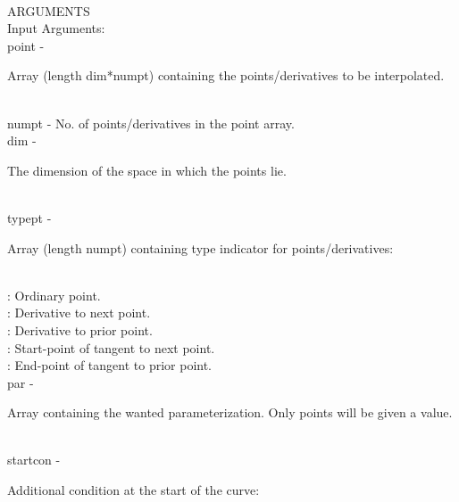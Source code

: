 \\
ARGUMENTS\\
        \>Input Arguments:\\
        \>\>    {\fov point}    \> - \> \begin{minipg2}
                                Array (length dim*numpt) containing the
                                points/derivatives to be interpolated.
                                \end{minipg2}\\[0.3ex]
        \>\>    {\fov numpt}    \> - \>
                                No. of points/derivatives in the
                                point array.
                                \\
        \>\>    {\fov dim}      \> - \> \begin{minipg2}
                                The dimension of the space in which
                                the points lie.
                                \end{minipg2}\\
        \>\>    {\fov typept}   \> - \> \begin{minipg2}
                                Array (length numpt) containing type
                                indicator for points/derivatives:
                                \end{minipg2} \\[0.3ex]
                \>\>\>\> : Ordinary point.\\
                \>\>\>\> : Derivative to next point.\\
                \>\>\>\> : Derivative to prior point.\\
                \>\>\>\> : Start-point of tangent to next point.\\
                \>\>\>\> : End-point of tangent to prior point.\\
        \>\>    {\fov par}      \> - \> \begin{minipg2}
                                Array containing the wanted parameterization. Only points will be given a value.
\end{minipg2}\\[0.3ex]
        \>\>    {\fov startcon} \> - \> \begin{minipg2}
                                Additional condition at the start
                                of the curve:
                                \end{minipg2}\\
